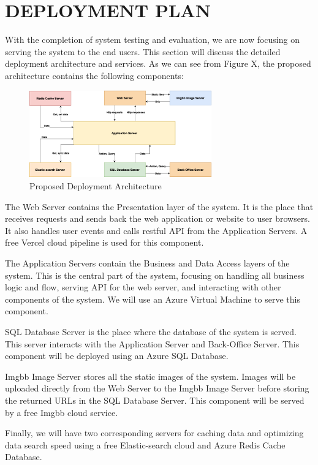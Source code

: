 \chapter{DEPLOYMENT PLAN} 
With the completion of system testing and evaluation, we are now 
focusing on serving the system to the end users. This section will 
discuss the detailed deployment architecture and services. As we 
can see from Figure X, the proposed architecture contains the 
following components:
\begin{figure}[H]
    \centering
    \includegraphics[width=0.7\textwidth]{Figures/Deployment/Pattern and Architecture-Deployment.drawio.png}
    \caption{Proposed Deployment Architecture}
    \label{fig:deployment-architecture}
\end{figure}
The Web Server contains the Presentation layer of the system. It is the place that receives requests and sends 
back the web application or website to user browsers. It also 
handles user events and calls restful API from the Application 
Servers. A free Vercel cloud pipeline is used for this component.

The Application Servers contain the Business and Data Access layers 
of the system. This is the central part of the system, focusing on 
handling all business logic and flow, serving API for the web server, 
and interacting with other components of the system. We will use an Azure 
Virtual Machine to serve this component.

SQL Database Server is the place where the database of the system is served. 
This server interacts with the Application Server and Back-Office Server. 
This component will be deployed using an Azure SQL Database.

Imgbb Image Server stores all the static images of the system. Images will 
be uploaded directly from the Web Server to the Imgbb Image Server before 
storing the returned URLs in the SQL Database Server. This component will 
be served by a free Imgbb cloud service.

Finally, we will have two corresponding servers for caching data and optimizing 
data search speed using a free Elastic-search cloud and Azure Redis Cache Database.